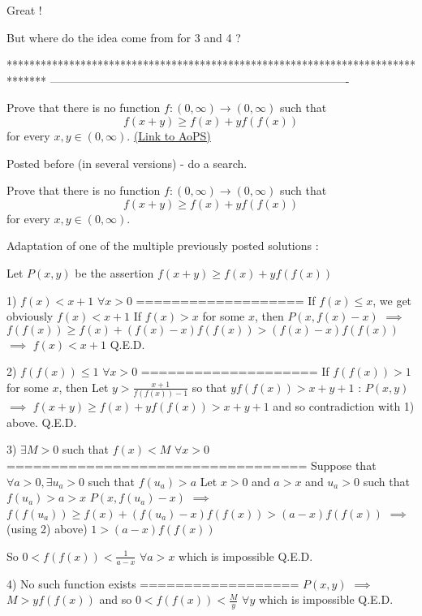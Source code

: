 \begin{solution}
	Great ! 

But  where do the idea come from for 3 and 4 ?
\end{solution}
*******************************************************************************
-------------------------------------------------------------------------------

\begin{problem}
	Prove that there is no function $f:(0,\infty )\rightarrow (0,\infty)$ such that
\[f(x+y)\ge f(x)+yf(f(x)) \]
for every $x,y\in (0,\infty )$.
	\flushright \href{https://artofproblemsolving.com/community/c6h386866}{(Link to AoPS)}
\end{problem}



\begin{solution}
	Posted before (in several versions) - do a search.
\end{solution}



\begin{solution}
	\begin{tcolorbox}Prove that there is no function $f:(0,\infty )\rightarrow (0,\infty)$ such that
\[f(x+y)\ge f(x)+yf(f(x)) \]
for every $x,y\in (0,\infty )$.\end{tcolorbox}
Adaptation of one of the multiple previously posted solutions :

Let $P(x,y)$ be the assertion $f(x+y)\ge f(x)+yf(f(x))$

1) $f(x)< x+1$ $\forall x>0$
===================
If $f(x)\le x$, we get obviously $f(x)< x+1$
If $f(x)>x$ for some $x$, then $P(x,f(x)-x)$ $\implies$ $f(f(x))\ge f(x)+(f(x)-x)f(f(x))>(f(x)-x)f(f(x))$ $\implies$ $f(x)< x+1$
Q.E.D.

2) $f(f(x))\le 1$ $\forall x>0$
====================
If $f(f(x))>1$ for some $x$, then Let $y>\frac{x+1}{f(f(x))-1}$ so that $yf(f(x))>x+y+1$ : 
$P(x,y)$ $\implies$ $f(x+y)\ge f(x)+yf(f(x))>x+y+1$ and so contradiction with 1) above.
Q.E.D.

3) $\exists M>0$ such that $f(x)<M$ $\forall x>0$
==================================
Suppose that $\forall a>0,\exists u_a>0$ such that $f(u_a)>a$
Let $x>0$ and $a>x$ and $u_a>0$ such that $f(u_a)>a>x$
$P(x,f(u_a)-x)$ $\implies$ $f(f(u_a))\ge f(x)+(f(u_a)-x)f(f(x))>(a-x)f(f(x))$ $\implies$ (using 2) above) $1>(a-x)f(f(x))$

So $0<f(f(x))<\frac 1{a-x}$ $\forall a>x$ which is impossible
Q.E.D.

4) No such function exists
==================
$P(x,y)$ $\implies$ $M>yf(f(x))$ and so $0<f(f(x))<\frac My$ $\forall y$ which is impossible
Q.E.D.
\end{solution}



